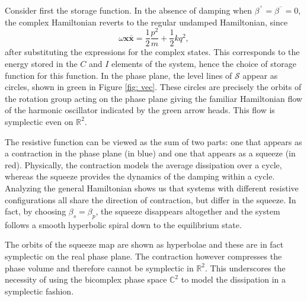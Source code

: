 Consider first the storage function.  
In the absence of damping when $\beta^{{}^+}=\beta^{{}^-} = 0$, the complex Hamiltonian reverts to the regular undamped Hamiltonian, since
\begin{equation}
   \omega\textbf{x}\bar{\textbf{x}} =
\frac{1}{2}\frac{p^2}{m} + \frac{1}{2} k q^2,  
\end{equation}
after substituting the expressions for the complex states.  This corresponds to the energy stored in the $C$ and $I$ elements of the system, hence the choice of  storage function for this function.  In the phase plane, the level lines of $\mathcal{S}$ appear as  circles,  shown in green in Figure \ref{fig: vec}.  These circles are precisely the orbits of the rotation group acting on the phase plane giving the familiar Hamiltonian flow of the harmonic oscillator indicated by the green arrow heads.  This flow is symplectic even on $\mathbb{R}^2$. 

The resistive function can be viewed as the sum of two parts: one that appears as a contraction in the phase plane (in blue) and one that appears as a squeeze (in red).
Physically, the contraction models the average dissipation over a cycle, whereas the squeeze provides the dynamics of the  damping within a cycle.
Analyzing the general Hamiltonian shows us that systems with different resistive configurations all share the direction of contraction, but differ in the squeeze. 
In fact, by choosing $\beta_s=\beta_p$, the squeeze disappears altogether and the system follows a smooth hyperbolic spiral down to the equilibrium state.

The orbits of the squeeze map are shown as hyperbolae and these are in fact symplectic on the real phase plane.  
The contraction however compresses the phase volume and therefore cannot be symplectic in $\mathbb{R}^2$.  
This underscores the necessity of using the bicomplex phase space  $\mathbb{C}^2$ to model the dissipation in a symplectic fashion.


